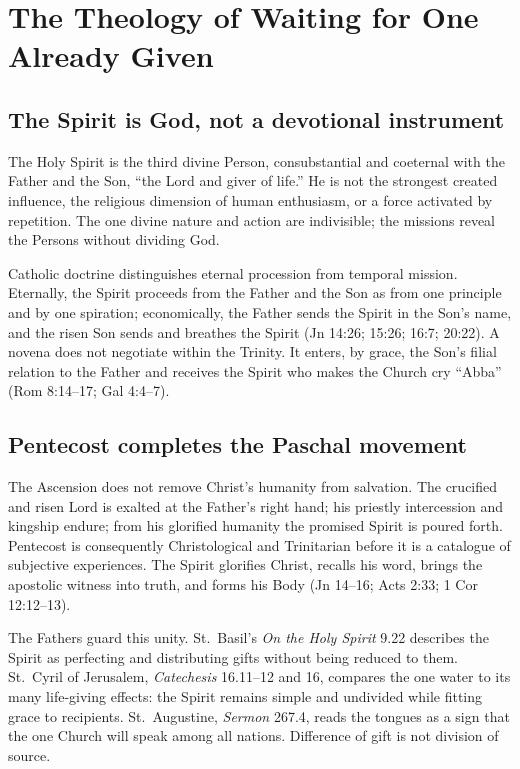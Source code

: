 \section{The Theology of Waiting for One Already Given}

\subsection{The Spirit is God, not a devotional instrument}

The Holy Spirit is the third divine Person, consubstantial and coeternal with the Father and the Son, “the Lord and giver of life.” He is not the strongest created influence, the religious dimension of human enthusiasm, or a force activated by repetition. The one divine nature and action are indivisible; the missions reveal the Persons without dividing God.

Catholic doctrine distinguishes eternal procession from temporal mission. Eternally, the Spirit proceeds from the Father and the Son as from one principle and by one spiration; economically, the Father sends the Spirit in the Son's name, and the risen Son sends and breathes the Spirit (Jn 14:26; 15:26; 16:7; 20:22). A novena does not negotiate within the Trinity. It enters, by grace, the Son's filial relation to the Father and receives the Spirit who makes the Church cry “Abba” (Rom 8:14--17; Gal 4:4--7).

\subsection{Pentecost completes the Paschal movement}

The Ascension does not remove Christ's humanity from salvation. The crucified and risen Lord is exalted at the Father's right hand; his priestly intercession and kingship endure; from his glorified humanity the promised Spirit is poured forth. Pentecost is consequently Christological and Trinitarian before it is a catalogue of subjective experiences. The Spirit glorifies Christ, recalls his word, brings the apostolic witness into truth, and forms his Body (Jn 14--16; Acts 2:33; 1 Cor 12:12--13).

The Fathers guard this unity. St.~Basil's \textit{On the Holy Spirit} 9.22 describes the Spirit as perfecting and distributing gifts without being reduced to them. St.~Cyril of Jerusalem, \textit{Catechesis} 16.11--12 and 16, compares the one water to its many life-giving effects: the Spirit remains simple and undivided while fitting grace to recipients. St.~Augustine, \textit{Sermon} 267.4, reads the tongues as a sign that the one Church will speak among all nations. Difference of gift is not division of source.

